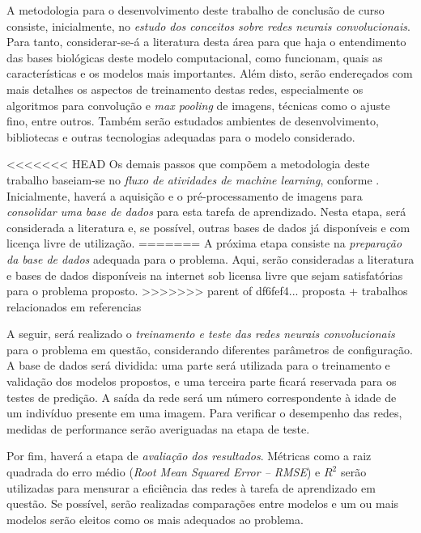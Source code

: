 A metodologia para o desenvolvimento deste trabalho de conclusão de curso consiste, inicialmente, no \emph{estudo dos conceitos sobre redes neurais convolucionais}. Para tanto, considerar-se-á a literatura desta área para que haja o entendimento das bases biológicas deste modelo computacional, como funcionam, quais as características e os modelos mais importantes. Além disto, serão endereçados com mais detalhes os aspectos de treinamento destas redes, especialmente os algoritmos para convolução e \emph{max pooling} de imagens, técnicas como o ajuste fino, entre outros. Também serão estudados ambientes de desenvolvimento, bibliotecas e outras tecnologias adequadas para o modelo considerado.

<<<<<<< HEAD
Os demais passos que compõem a metodologia deste trabalho baseiam-se no \emph{fluxo de atividades de machine learning}, conforme \cite{marsland2015machine}. Inicialmente, haverá a aquisição e o pré-processamento de imagens para \emph{consolidar uma base de dados} para esta tarefa de aprendizado. Nesta etapa, será considerada a literatura e, se possível, outras bases de dados já disponíveis e com licença livre de utilização.
=======
A próxima etapa consiste na \emph{preparação da base de dados} adequada para o problema. Aqui, serão consideradas a literatura e bases de dados disponíveis na internet sob licensa livre que sejam satisfatórias para o problema proposto.
>>>>>>> parent of df6fef4... proposta + trabalhos relacionados em referencias

A seguir, será realizado o \emph{treinamento e teste das redes neurais convolucionais} para o problema em questão, considerando diferentes parâmetros de configuração. A base de dados será dividida: uma parte será utilizada para o treinamento e validação dos modelos propostos, e uma terceira parte ficará reservada para os testes de predição. A saída da rede será um número correspondente à idade de um indivíduo presente em uma imagem. Para verificar o desempenho das redes, medidas de performance serão averiguadas na etapa de teste.

Por fim, haverá a etapa de \emph{avaliação dos resultados}. Métricas como a raiz quadrada do erro médio (\emph{Root Mean Squared Error -- RMSE}) e $R^2$ serão utilizadas para mensurar a eficiência das redes à tarefa de aprendizado em questão. Se possível, serão realizadas comparações entre modelos e um ou mais modelos serão eleitos como os mais adequados ao problema.
